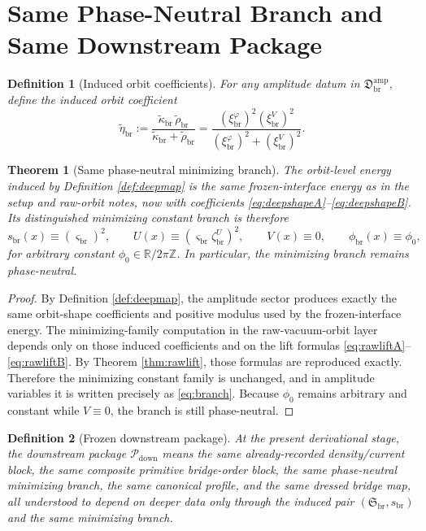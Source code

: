 \documentclass[11pt]{article}
\newcommand{\RespShapeCov}{\widetilde\kappa_{\mathrm{br}}}
\newcommand{\RespShapeRelax}{\widetilde\rho_{\mathrm{br}}}
\newcommand{\RespShapeIso}{\widetilde\eta_{\mathrm{br}}}
\newcommand{\RespVacPhase}{\phi_{\mathrm{br}}}
\newcommand{\DownPkg}{\mathscr P_{\mathrm{down}}}
\newcommand{\ShapeTuple}{\mathfrak S_{\mathrm{br}}}
\newcommand{\ScaleMod}{s_{\mathrm{br}}}
\newcommand{\DeepSector}{\mathfrak D_{\mathrm{br}}^{\mathrm{amp}}}
\newcommand{\DeepCovAmp}{\xi_{\mathrm{br}}^{\varphi}}
\newcommand{\DeepRelaxAmp}{\xi_{\mathrm{br}}^{V}}
\newcommand{\DeepEqAmp}{\zeta_{\mathrm{br}}^{U}}
\newcommand{\DeepScaleAmp}{\varsigma_{\mathrm{br}}}
\newtheorem{definition}{Definition}
\newtheorem{theorem}{Theorem}
\begin{document}
\section{Same Phase-Neutral Branch and Same Downstream Package}

\begin{definition}[Induced orbit coefficients]
\label{def:iso}
For any amplitude datum in \(\DeepSector\), define the induced orbit coefficient
\begin{equation}
\RespShapeIso
:=
\frac{\RespShapeCov\,\RespShapeRelax}{\RespShapeCov+\RespShapeRelax}
=
\frac{(\DeepCovAmp)^{2}(\DeepRelaxAmp)^{2}}{(\DeepCovAmp)^{2}+(\DeepRelaxAmp)^{2}}.
\label{eq:iso}
\end{equation}
\end{definition}

\begin{theorem}[Same phase-neutral minimizing branch]
\label{thm:branch}
The orbit-level energy induced by Definition \ref{def:deepmap} is the same frozen-interface energy as in the setup and raw-orbit notes, now with coefficients \eqref{eq:deepshapeA}--\eqref{eq:deepshapeB}. Its distinguished minimizing constant branch is therefore
\begin{equation}
\ScaleMod(x)\equiv (\DeepScaleAmp)^{2},
\qquad
U(x)\equiv (\DeepScaleAmp\DeepEqAmp)^{2},
\qquad
V(x)\equiv 0,
\qquad
\RespVacPhase(x)\equiv \phi_{0},
\label{eq:branch}
\end{equation}
for arbitrary constant \(\phi_{0}\in\mathbb R/2\pi\mathbb Z\). In particular, the minimizing branch remains phase-neutral.
\end{theorem}

\begin{proof}
By Definition \ref{def:deepmap}, the amplitude sector produces exactly the same orbit-shape coefficients and positive modulus used by the frozen-interface energy. The minimizing-family computation in the raw-vacuum-orbit layer depends only on those induced coefficients and on the lift formulas \eqref{eq:rawliftA}--\eqref{eq:rawliftB}. By Theorem \ref{thm:rawlift}, those formulas are reproduced exactly. Therefore the minimizing constant family is unchanged, and in amplitude variables it is written precisely as \eqref{eq:branch}. Because \(\phi_{0}\) remains arbitrary and constant while \(V\equiv0\), the branch is still phase-neutral.
\end{proof}

\begin{definition}[Frozen downstream package]
\label{def:downstream}
At the present derivational stage, the downstream package \(\DownPkg\) means the same already-recorded density/current block, the same composite primitive bridge-order block, the same phase-neutral minimizing branch, the same canonical profile, and the same dressed bridge map, all understood to depend on deeper data only through the induced pair \((\ShapeTuple,\ScaleMod)\) and the same minimizing branch.
\end{definition}
\end{document}

